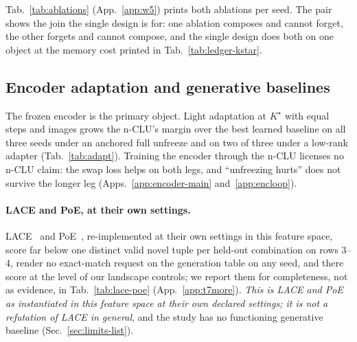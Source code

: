 \documentclass{article} %
\newcommand{\Kstar}{\ensuremath{K^{\star}}}
\begin{document}
Tab.~\ref{tab:ablations} (App.~\ref{app:w5}) prints both ablations per seed. The pair shows
the join the single design is for: one ablation composes and cannot
forget, the other forgets and cannot compose, and the single design does both on one object at
the memory cost printed in Tab.~\ref{tab:ledger-kstar}.

\subsection{Encoder adaptation and generative baselines}
\label{sec:adapt}\label{sec:bard}

The frozen encoder is the primary object. Light adaptation at $\Kstar$ with equal steps and
images grows the n-CLU's margin over the best learned baseline on all three seeds under an
anchored full unfreeze and on two
of three under a low-rank adapter (Tab.~\ref{tab:adapt}). %
Training the encoder through the n-CLU licenses no n-CLU claim: the swap loss helps on both legs,
and ``unfreezing hurts'' does not survive the longer leg (Apps.~\ref{app:encoder-main}
and~\ref{app:encloop}).

\paragraph{LACE and PoE, at their own settings.}
LACE~\citep{nie_controllable_2021} and PoE~\citep{hinton_training_2002}, re-implemented at their own
settings in this feature space, score far below one distinct valid novel tuple per held-out combination %
on rows 3--4, render no exact-match request on the generation table on any seed, and there score at
the level of our landscape controls; we report them for completeness, not as evidence, in
Tab.~\ref{tab:lace-poe} (App.~\ref{app:t7more}). \emph{This is LACE and PoE as instantiated in
this feature space at their own declared settings; it is not a refutation of LACE in general}, and
the study has no functioning generative baseline (Sec.~\ref{sec:limits-list}).
\end{document}
